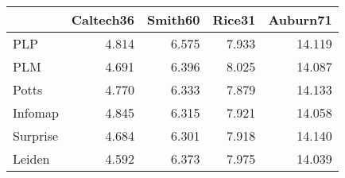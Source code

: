 \begin{tabular}{lrrrr}
\toprule
{} & Caltech36 & Smith60 & Rice31 & Auburn71 \\
\midrule
PLP      &     4.814 &   6.575 &  7.933 &   14.119 \\
PLM      &     4.691 &   6.396 &  8.025 &   14.087 \\
Potts    &     4.770 &   6.333 &  7.879 &   14.133 \\
Infomap  &     4.845 &   6.315 &  7.921 &   14.058 \\
Surprise &     4.684 &   6.301 &  7.918 &   14.140 \\
Leiden   &     4.592 &   6.373 &  7.975 &   14.039 \\
\bottomrule
\end{tabular}
